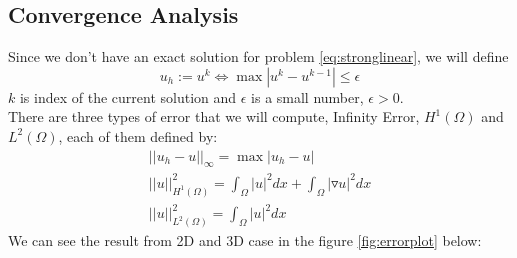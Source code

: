 \documentclass[a4paper,11pt]{article}
\begin{document}
\subsection{Convergence Analysis}
Since we don't have an exact solution for problem \eqref{eq:stronglinear}, we will define $$u_h:= u^k \iff \max|u^k-u^{k-1}| \leq \epsilon$$ $k$ is index of the current solution and $\epsilon$ is a small number, $\epsilon > 0$.\\
There are three types of error that we will compute, Infinity Error, $H^1(\Omega)$ and $L^2(\Omega)$, each of them defined by:
\begin{eqnarray}
||u_h - u||_\infty = \max|u_h-u|\\
||u||^2_{H^1(\Omega)} = \int_\Omega |u|^2 dx + \int_\Omega |\triangledown u|^2 dx\\
||u||^2_{L^2(\Omega)} = \int_\Omega |u|^2 dx
\end{eqnarray}
We can see the result from 2D and 3D case in the figure \ref{fig:errorplot} below:
\end{document}
